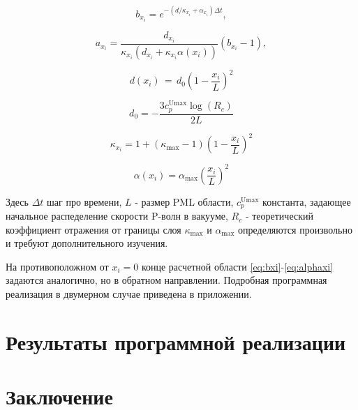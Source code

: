 \documentclass[a4paper, fontsize=14pt]{article}
\begin{document}
\begin{equation}
    \label{eq:bxi}
    b_{x_i}=e^{-(d/\kappa_{x_i}+\alpha_{x_i})\Delta t},
\end{equation}

\begin{equation}
    a_{x_i}=\frac{d_{x_i}}{\kappa_{x_i}(d_{x_i}+\kappa_{x_i}\alpha(x_i))}(b_{x_i}-1),
\end{equation}

\begin{equation}
    d(x_i)\,=\,d_{0}\left(1 - \frac{x_i}{L}\right)^{2}
\end{equation}

\begin{equation}
    d_{0}=-{\frac{3 c_{p}^{\mathrm{Umax}}\log(R_{c})}{2 L}}
\end{equation}

\begin{equation}
    \kappa_{x_{i}}=1+(\kappa_{\operatorname*{max}}-1)\left(1 - \frac{x_{i}}{L}\right)^{2}
\end{equation}

\begin{equation}
    \label{eq:alphaxi}
    \alpha(x_i) = \alpha_{\operatorname*{max}} \left(\frac{x_i}{L}\right)^2
\end{equation}

Здесь $\Delta t$ шаг про времени, $L$ - размер PML области, 
$c_{p}^{\mathrm{Umax}}$ константа, задающее начальное распеделение скорости P-волн в вакууме, 
$R_c$ - теоретический коэффициент отражения от границы слоя
$\kappa_{\operatorname*{max}}$ и $\alpha_{\operatorname*{max}}$ определяются произвольно и требуют дополнительного изучения.

На противоположном от $x_i = 0$ конце расчетной области \eqref{eq:bxi}-\eqref{eq:alphaxi} задаются аналогично, но в обратном направлении. Подробная программная реализация в двумерном случае приведена в приложении.

\section*{Результаты программной реализации} 


\newpage
\section*{Заключение}
\end{document}
